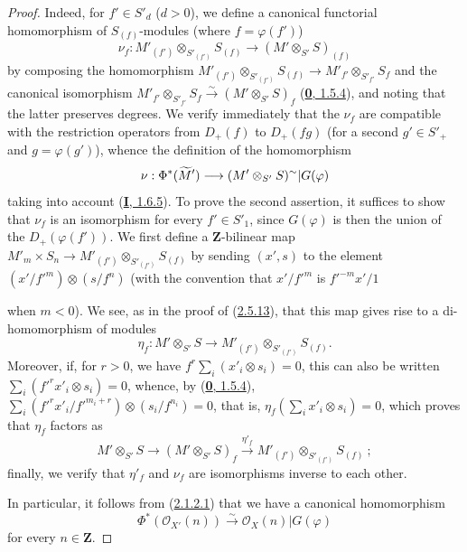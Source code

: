 \begin{proof}
Indeed, for $f'\in S'_d$ ($d>0$), we define a canonical functorial
homomorphism of $S_{(f)}$-modules (where $f=\varphi(f')$)
\[
\label{II.2.8.8.1}
  \nu_f:M'_{(f')}\otimes_{S'_{(f')}}S_{(f)}
  \longrightarrow(M'\otimes_{S'}S)_{(f)}
\tag{2.8.8.1}
\]
by composing the homomorphism
$M'_{(f')}\otimes_{S'_{(f')}}S_{(f)}\to
M'_{f'}\otimes_{S'_{f'}}S_f$ and the canonical isomorphism
$M'_{f'}\otimes_{S'_{f'}}S_f\xrightarrow{\sim}(M'\otimes_{S'}S)_f$
(\hyperref[0.1.5.4]{\textbf{0}, 1.5.4}), and noting that the latter preserves
degrees. We verify immediately that the $\nu_f$ are compatible with the
restriction operators from $D_+(f)$ to $D_+(fg)$ (for a second $g'\in S'_+$
and $g=\varphi(g')$), whence the definition of the homomorphism
\[
  \nu:\Phi^*(\widetilde{M}')
  \longrightarrow(M'\otimes_{S'}S)^{\sim}|G(\varphi)
\]
taking into account (\hyperref[I.1.6.5]{\textbf{I}, 1.6.5}). To prove the second
assertion, it suffices to show that $\nu_f$ is an isomorphism for every
$f'\in S'_1$, since $G(\varphi)$ is then the union of the
$D_+(\varphi(f'))$. We first define a $\mathbf{Z}$-bilinear map
$M'_m\times S_n\to M'_{(f')}\otimes_{S'_{(f')}}S_{(f)}$ by sending
$(x',s)$ to the element
$(x'/{f'}^m)\otimes(s/f^n)$ (with the convention that $x'/{f'}^m$ is
${f'}^{-m}x'/1$

when $m<0$). We see, as in the proof of
(\hyperref[II.2.5.13]{2.5.13}), that this map gives rise to a
di-homomorphism of modules
\[
  \eta_f:M'\otimes_{S'}S
  \longrightarrow M'_{(f')}\otimes_{S'_{(f')}}S_{(f)}.
\]
Moreover, if, for $r>0$, we have
$f^r\sum_i(x'_i\otimes s_i)=0$, this can also be written
$\sum_i({f'}^rx'_i\otimes s_i)=0$, whence, by
(\hyperref[0.1.5.4]{\textbf{0}, 1.5.4}),
$\sum_i({f'}^rx'_i/{f'}^{m_i+r})\otimes(s_i/f^{n_i})=0$, that is,
$\eta_f(\sum_i x'_i\otimes s_i)=0$, which proves that $\eta_f$ factors
as
\[
  M'\otimes_{S'}S\longrightarrow(M'\otimes_{S'}S)_f
  \xrightarrow{\eta'_f}M'_{(f')}\otimes_{S'_{(f')}}S_{(f)}~;
\]
finally, we verify that $\eta'_f$ and $\nu_f$ are isomorphisms inverse to each
other.

In particular, it follows from (\hyperref[II.2.1.2.1]{2.1.2.1}) that we
have a canonical homomorphism
\[
\label{II.2.8.8.2}
  \Phi^*(\mathcal{O}_{X'}(n))\xrightarrow{\sim}
  \mathcal{O}_X(n)|G(\varphi)
\tag{2.8.8.2}
\]
for every $n\in\mathbf{Z}$.
\end{proof}

